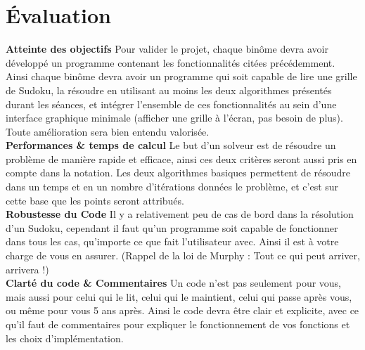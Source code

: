 \documentclass[a4paper,12pt]{article}
\begin{document}
	\section{Évaluation}
	\textbf{Atteinte des objectifs}  Pour valider le projet, chaque binôme devra avoir développé un programme contenant les fonctionnalités citées précédemment. \\
	Ainsi chaque binôme devra avoir un programme qui soit capable de lire une grille de Sudoku, la résoudre en utilisant au moins les deux algorithmes présentés durant les séances, et intégrer l'ensemble de ces fonctionnalités au sein d'une interface graphique minimale (afficher une grille à l'écran, pas besoin de plus). \\
	Toute amélioration sera bien entendu valorisée. \\
	
	\textbf{Performances \& temps de calcul}  Le but d'un solveur est de résoudre un problème de manière rapide et efficace, ainsi ces deux critères seront aussi pris en compte dans la notation. Les deux algorithmes basiques permettent de résoudre dans un temps et en un nombre d'itérations données le problème, et c'est sur cette base que les points seront attribués. \\
	
	\textbf{Robustesse du Code}  Il y a relativement peu de cas de bord dans la résolution d'un Sudoku, cependant il faut qu'un programme soit capable de fonctionner dans tous les cas, qu'importe ce que fait l'utilisateur avec. Ainsi il est à votre charge de vous en assurer. (Rappel de la loi de Murphy : Tout ce qui peut arriver, arrivera !) \\
	
	\textbf{Clarté du code \& Commentaires} Un code n'est pas seulement pour vous, mais aussi pour celui qui le lit, celui qui le maintient, celui qui passe après vous, ou même pour vous 5 ans après. Ainsi le code devra être clair et explicite, avec ce qu'il faut de commentaires pour expliquer le fonctionnement de vos fonctions et les choix d'implémentation. 
\end{document}
